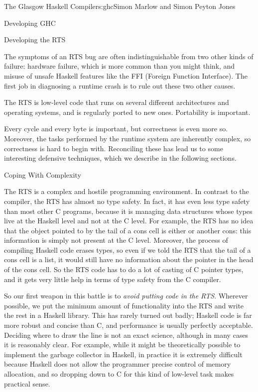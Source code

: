 \begin{aosachapter}{The Glasgow Haskell Compiler}{s:ghc}{Simon Marlow and Simon Peyton Jones}
\begin{aosasect1}{Developing GHC}
\begin{aosasect2}{Developing the RTS}
\begin{aosaenumerate}
  The symptoms of an RTS bug are often indistinguishable from two
  other kinds of failure: hardware failure, which is more common than
  you might think, and misuse of unsafe Haskell features like the FFI
  (Foreign Function Interface).
  The first job in diagnosing a runtime crash is to rule out these two
  other causes.

\item The RTS is low-level code that runs on several different
  architectures and operating systems, and is regularly ported to new
  ones.  Portability is important.

\end{aosaenumerate}

Every cycle and every byte is important, but correctness is even more
so.  Moreover, the tasks performed by the runtime system are
inherently complex, so correctness is hard to begin with.
Reconciling these has lead us to some interesting defensive
techniques, which we describe in the following sections.

\begin{aosasect3}{Coping With Complexity}
\label{s:rtsbugs}

The RTS is a complex and hostile programming environment.  In contrast
to the compiler, the RTS has almost no type safety.  In fact, it has
even less type safety than most other C programs, because it is
managing data structures whose types live at the Haskell level and not
at the C level.  For example, the RTS has no idea that the object
pointed to by the tail of a cons cell is either \code{[]} or another
cons: this information is simply not present at the C level.
Moreover, the process of compiling Haskell code erases types, so even
if we told the RTS that the tail of a cons cell is a list, it would
still have no information about the pointer in the head of the cons
cell.  So the RTS code has to do a lot of casting of C pointer types,
and it gets very little help in terms of type safety from the C
compiler.

So our first weapon in this battle is to \emph{avoid putting code in
  the RTS}.  Wherever possible, we put the minimum amount of
functionality into the RTS and write the rest in a Haskell library.
This has rarely turned out badly; Haskell code is far more robust and
concise than C, and performance is usually perfectly acceptable.
Deciding where to draw the line is not an exact science, although in
many cases it is reasonably clear.  For example, while it might be
theoretically possible to implement the garbage collector in Haskell,
in practice it is extremely difficult because Haskell does not allow
the programmer precise control of memory allocation, and so dropping
down to C for this kind of low-level task makes practical sense.


\end{aosasect3}
\end{aosasect2}
\end{aosasect1}
\end{aosachapter}

